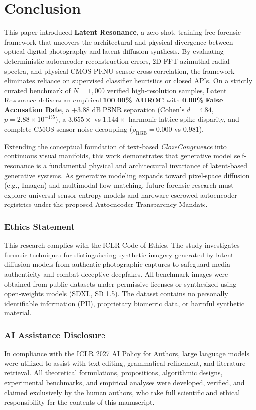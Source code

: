 \documentclass{article}
\theoremstyle{definition}
\begin{document}
\section{Conclusion}
\label{sec:conclusion}

This paper introduced \textbf{Latent Resonance}, a zero-shot, training-free forensic framework that uncovers the architectural and physical divergence between optical digital photography and latent diffusion synthesis. By evaluating deterministic autoencoder reconstruction errors, 2D-FFT azimuthal radial spectra, and physical CMOS PRNU sensor cross-correlation, the framework eliminates reliance on supervised classifier heuristics or closed APIs. On a strictly curated benchmark of $N=1,000$ verified high-resolution samples, Latent Resonance delivers an empirical \textbf{100.00\% AUROC} with \textbf{0.00\% False Accusation Rate}, a $+3.88\text{ dB}$ PSNR separation ($\text{Cohen's } d = 4.84$, $p = 2.88 \times 10^{-165}$), a $3.655\times$ vs $1.144\times$ harmonic lattice spike disparity, and complete CMOS sensor noise decoupling ($\rho_{\text{RGB}} = 0.000$ vs $0.981$). 

Extending the conceptual foundation of text-based \textit{ClozeCongruence} into continuous visual manifolds, this work demonstrates that generative model self-resonance is a fundamental physical and architectural invariance of latent-based generative systems. As generative modeling expands toward pixel-space diffusion (e.g., Imagen) and multimodal flow-matching, future forensic research must explore universal sensor entropy models and hardware-escrowed autoencoder registries under the proposed Autoencoder Transparency Mandate.

\subsubsection*{Ethics Statement}
This research complies with the ICLR Code of Ethics. The study investigates forensic techniques for distinguishing synthetic imagery generated by latent diffusion models from authentic photographic captures to safeguard media authenticity and combat deceptive deepfakes. All benchmark images were obtained from public datasets under permissive licenses or synthesized using open-weights models (SDXL, SD 1.5). The dataset contains no personally identifiable information (PII), proprietary biometric data, or harmful synthetic material.

\subsubsection*{AI Assistance Disclosure}
In compliance with the ICLR 2027 AI Policy for Authors, large language models were utilized to assist with text editing, grammatical refinement, and literature retrieval. All theoretical formulations, propositions, algorithmic designs, experimental benchmarks, and empirical analyses were developed, verified, and claimed exclusively by the human authors, who take full scientific and ethical responsibility for the contents of this manuscript.
\end{document}
